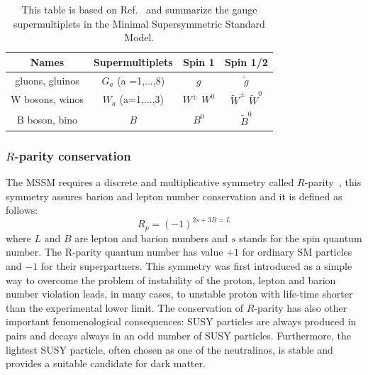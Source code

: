 \begin{table}
\begin{center}
\renewcommand{\arraystretch}{1.5}
\begin{tabular}{c|ccc}
Names			&Supermultiplets& Spin 1 		&	Spin 1/2 \\
\hline
gluons, gluinos		&$G_a$ (a =1,...,8)	& $g$			& $\tilde{g}$	\\
W bosons, winos		& $W_a$ (a=1,...,3)	& $W^{\pm}$ $W^0$	& $\tilde{W}^{\pm}$ $\tilde{W}^0$ \\
B boson, bino		&$B$			& $B^0$			& $\tilde{B}^0$ \\
\hline
\end{tabular}
\caption{This table is based on Ref.~\cite{SusyPrimer} and summarize the gauge supermultiplets in the Minimal Supersymmetric Standard Model.}
\label{tab:gaugesup}
\end{center}
\end{table}

\subsubsection{$R$-parity conservation}
The MSSM requires a discrete and multiplicative symmetry called $R$-parity~\cite{Susy3}, this symmetry assures barion and lepton number 
conservation and it is defined as follows:
\begin{equation}
R_p = (-1)^{2s+3B=L}
\end{equation}
where $L$ and $B$ are lepton and barion numbers and $s$ stands for the spin quantum number. The R-parity quantum number has value $+1$ for ordinary
SM particles and $-1$ for their superpartners. This symmetry was first introduced as a simple way to overcome the problem of instability of the proton,
lepton and barion number violation leads, in many cases, 
to unstable proton with life-time shorter than the experimental lower limit. The conservation of $R$-parity has also other important 
fenomenological consequences: SUSY particles are always produced in pairs and decays always in an odd number of SUSY particles.
Furthermore, the lightest SUSY particle, often chosen as one of the neutralinos, is stable and provides a suitable 
candidate for dark matter.


